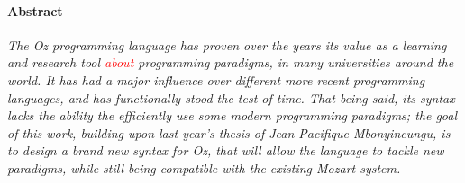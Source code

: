 
\paragraph{Abstract}
\textit{
The Oz programming language has proven over the years its value as a learning and research tool \textcolor{red}{about} programming paradigms, in many universities around the world.
It has had a major influence over different more recent programming languages, and has functionally stood the test of time.
That being said, its syntax lacks the ability the efficiently use some modern programming paradigms;
the goal of this work, building upon last year's thesis of Jean-Pacifique Mbonyincungu, is to design a brand new syntax for Oz, that will allow the language to tackle new paradigms, while still being compatible with the existing Mozart system.
}